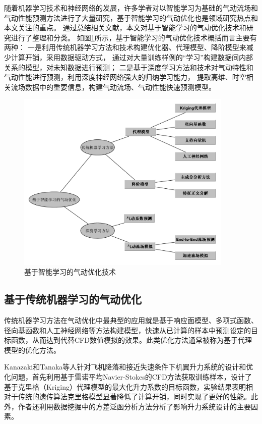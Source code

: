 随着机器学习技术和神经网络的发展，许多学者对以智能学习为基础的气动流场和气动性能预测方法进行了大量研究，基于智能学习的气动优化也是领域研究热点和本文关注的重点。
通过总结相关文献，本文对基于智能学习的气动优化技术和研究进行了整理和分类。
如图\ref{fig:智能优化}所示，基于智能学习的气动优化技术概括而言主要有两种：
一是利用传统机器学习方法和技术构建优化器、代理模型、降阶模型来减少计算开销，采用数据驱动方式，
通过对大量训练样例的“学习”构建数据间内部关系的模型，对未知数据进行预测；
二是基于深度学习方法和技术对气动特性和气动性能进行预测，利用深度神经网络强大的归纳学习能力，
提取高维、时空相关流场数据中的重要信息，构建气动流场、气动性能快速预测模型。

\begin{figure}[htp]
	\centering
	\includegraphics[width=0.92\textwidth]{figures/aicfd.pdf}
	\caption{基于智能学习的气动优化技术}
	\label{fig:智能优化}
\end{figure}

\subsection{基于传统机器学习的气动优化}
传统机器学习方法在气动优化中最典型的应用就是基于响应面模型、多项式函数、径向基函数和人工神经网络等方法构建模型，快速从已计算的样本中预测设定的目标函数，从而达到代替CFD数值模拟的效果。此类优化方法通常被称为基于代理模型的优化方法。

Kanazaki和Tanaka等人\cite{Kanazaki2007Multi}针对飞机降落和接近失速条件下机翼升力系统的设计和优化问题，首先利用基于雷诺平均Navier-Stokes的CFD方法获取训练样本，设计了基于克里格（Kriging）代理模型的最大化升力系数的目标函数，实验结果表明相对于传统的遗传算法克里格模型显著降低了计算开销，同时实现了更好的性能。此外，作者还利用数据挖掘中的方差泛函分析方法分析了影响升力系统设计的主要因素。

